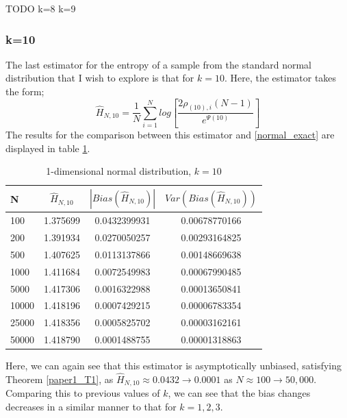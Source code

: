 \documentclass{article}
\begin{document}
TODO 
k=8
k=9





\subsubsection{k=10} \label{N_k=10}
The last estimator for the entropy of a sample from the standard normal distribution that I wish to explore is that for $k=10$. Here, the estimator takes the form;
\begin{equation}
\hat{H}_{N, 10} = \frac{1}{N} \sum_{i=1}^{N} log \left[ \frac{2\rho_{(10),i}(N-1)}{e^{\Psi(10)}} \right] \nonumber
\end{equation}
The results for the comparison between this estimator and \ref{normal_exact} are displayed in table \ref{normal_k=10_table}.

\begin{table}
\caption{1-dimensional normal distribution, $k=10$} \label{normal_k=10_table}
\begin{center}
\begin{tabular}{| l | c c c|} 
\toprule
N & $\hat{H}_{N, 10}$ & $|Bias(\hat{H}_{N, 10})|$ & $Var(Bias(\hat{H}_{N, 10}))$ \\
\midrule[1pt]
100     & 1.375699     & 0.0432399931     & 0.00678770166  \\
200     & 1.391934     & 0.0270050257     & 0.00293164825  \\
500     & 1.407625     & 0.0113137866     & 0.00148669638  \\
1000    & 1.411684     & 0.0072549983     & 0.00067990485  \\
5000    & 1.417306     & 0.0016322988     & 0.00013650841  \\
10000   & 1.418196     & 0.0007429215     & 0.00006783354  \\
25000   & 1.418356     & 0.0005825702     & 0.00003162161  \\
50000   & 1.418790     & 0.0001488755     & 0.00001318863  \\
\hline
\end{tabular}
\end{center}
\end{table}

Here, we can again see that this estimator is asymptotically unbiased, satisfying Theorem \ref{paper1_T1}, as $\hat{H}_{N, 10} \approx  0.0432 \to 0.0001$ as $N \approx 100 \to 50,000$. Comparing this to previous values of $k$, we can see that the bias changes decreases in a similar manner to that for $k=1, 2, 3$.
\end{document}
